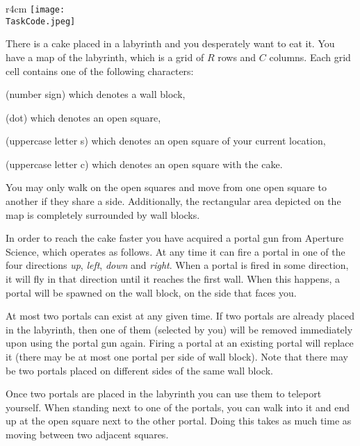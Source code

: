 \documentclass{boi2014}
\renewcommand{\TaskCode}{portals}
\newcommand{\constant}[1]{{\tt #1}}
\begin{document}
    \begin{wrapfigure}[4]{r}{4cm}
        \vspace{-24pt}
		\texttt{[image: \\TaskCode.jpeg]}
	\end{wrapfigure}

    There is a cake placed in a labyrinth and you desperately want to eat
    it. You have a map of the labyrinth, which is a grid of $R$ rows and $C$
    columns.  Each grid cell contains one of the following characters:
    \begin{description}[itemindent=1pt]
    	\item[\constant{\#}] (number sign) which denotes a wall block,
        \item[\constant{.}] (dot) which denotes an open square,
        \item[\constant{S}] (uppercase letter s) which denotes an open square of
        your current location,
        \item[\constant{C}] (uppercase letter c) which denotes an open square
        with the cake.
    \end{description}

    You may only walk on the open squares and move from one open square to
    another if they share a side. Additionally, the rectangular area depicted on
    the map is completely surrounded by wall blocks.

    In order to reach the cake faster you have acquired a portal gun from
    Aperture Science\texttrademark{}, which operates as follows.
    At any time it can fire a portal in one of the four directions
    \emph{up}, \emph{left}, \emph{down} and \emph{right}.
    When a portal is fired in some direction, it will fly in that direction
    until it reaches the first wall. When this happens, a portal
    will be spawned on the wall block, on the side that faces you.

    At most two portals can exist at any given time. If two portals are already
    placed in the labyrinth, then one of them (selected by you) will be removed
    immediately upon using the portal gun again. Firing a portal at an existing
    portal will replace it (there may be at
    most one portal per side of wall block).  Note that there may be two portals
    placed on different sides of the same wall block.

    Once two portals are placed in the labyrinth you can use them to
    teleport yourself. When standing next to one of the portals,
    you can walk into it and end up at the open square next to the other
    portal. Doing this takes as much time as moving between two
    adjacent squares.
\end{document}
